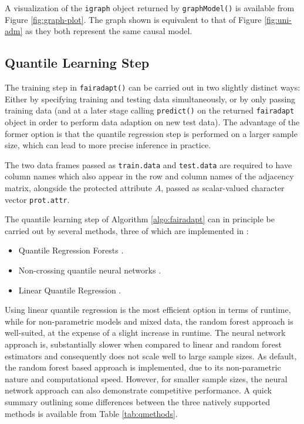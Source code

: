\documentclass[
  nojss]{jss}
\providecommand{\tightlist}{%
  \setlength{\itemsep}{0pt}\setlength{\parskip}{0pt}}
\begin{document}
A visualization of the \texttt{igraph} object returned by
\texttt{graphModel()} is available from Figure \ref{fig:graph-plot}. The
graph shown is equivalent to that of Figure \ref{fig:uni-adm} as they
both represent the same causal model.

\hypertarget{quantile-learning-step}{%
\subsection{Quantile Learning Step}\label{quantile-learning-step}}

The training step in \texttt{fairadapt()} can be carried out in two
slightly distinct ways: Either by specifying training and testing data
simultaneously, or by only passing training data (and at a later stage
calling \texttt{predict()} on the returned \texttt{fairadapt} object in
order to perform data adaption on new test data). The advantage of the
former option is that the quantile regression step is performed on a
larger sample size, which can lead to more precise inference in
practice.

The two data frames passed as \texttt{train.data} and \texttt{test.data}
are required to have column names which also appear in the row and
column names of the adjacency matrix, alongside the protected attribute
\(A\), passed as scalar-valued character vector \texttt{prot.attr}.

The quantile learning step of Algorithm \ref{algo:fairadapt} can in
principle be carried out by several methods, three of which are
implemented in :

\begin{itemize}
\tightlist
\item
  Quantile Regression Forests
  \citep{meinshausen2006qrf, wright2015ranger}.
\item
  Non-crossing quantile neural networks
  \citep{cannon2018non, cannon2015package}.
\item
  Linear Quantile Regression \citep{koenker2001qr, koenker2018package}.
\end{itemize}

Using linear quantile regression is the most efficient option in terms
of runtime, while for non-parametric models and mixed data, the random
forest approach is well-suited, at the expense of a slight increase in
runtime. The neural network approach is, substantially slower when
compared to linear and random forest estimators and consequently does
not scale well to large sample sizes. As default, the random forest
based approach is implemented, due to its non-parametric nature and
computational speed. However, for smaller sample sizes, the neural
network approach can also demonstrate competitive performance. A quick
summary outlining some differences between the three natively supported
methods is available from Table \ref{tab:qmethods}.
\end{document}
